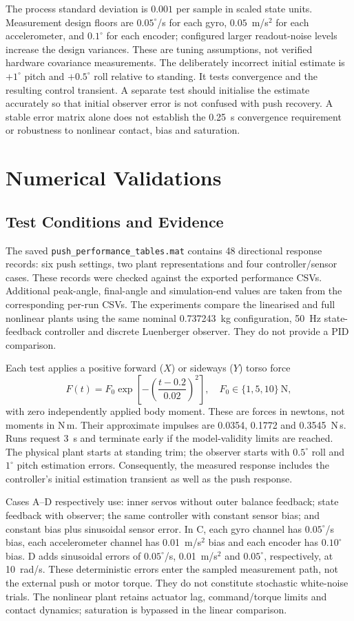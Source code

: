 \documentclass[conference,a4paper]{IEEEtran}
\begin{document}
The process standard deviation is $0.001$ per sample in scaled state units.
Measurement design floors are $0.05^\circ$/s for each gyro,
$0.05$~m/s$^2$ for each accelerometer, and $0.1^\circ$ for each encoder;
configured larger readout-noise levels increase the design variances.
These are tuning assumptions, not verified hardware covariance measurements.
The deliberately incorrect initial estimate is $+1^\circ$ pitch and
$+0.5^\circ$ roll relative to standing. It tests convergence and the resulting
control transient. A separate test should initialise the estimate accurately
so that initial observer error is not confused with push recovery.
A stable error matrix alone does not establish the 0.25~s convergence
requirement or robustness to nonlinear contact, bias and saturation.

\section{Numerical Validations}
\label{sec:numerical_validations}
\subsection{Test Conditions and Evidence}
The saved \texttt{push\_performance\_tables.mat} contains 48 directional response records: six push settings, two plant representations and four controller/sensor cases. These records were checked against the exported performance CSVs. Additional peak-angle, final-angle and simulation-end values are taken from the corresponding per-run CSVs. The experiments compare the linearised and full nonlinear plants using the same nominal 0.737243~kg configuration, 50~Hz state-feedback controller and discrete Luenberger observer. They do not provide a PID comparison.

Each test applies a positive forward ($X$) or sideways ($Y$) torso force
\[
F(t)=F_0\exp\!\left[-\left(\frac{t-0.2}{0.02}\right)^2\right],
\quad F_0\in\{1,5,10\}\ \mathrm{N},
\]
with zero independently applied body moment. These are forces in newtons, not moments in N\,m. Their approximate impulses are 0.0354, 0.1772 and 0.3545~N\,s. Runs request 3~s and terminate early if the model-validity limits are reached. The physical plant starts at standing trim; the observer starts with $0.5^\circ$ roll and $1^\circ$ pitch estimation errors. Consequently, the measured response includes the controller's initial estimation transient as well as the push response.

Cases A--D respectively use: inner servos without outer balance feedback; state feedback with observer; the same controller with constant sensor bias; and constant bias plus sinusoidal sensor error. In C, each gyro channel has $0.05^\circ$/s bias, each accelerometer channel has 0.01~m/s$^2$ bias and each encoder has $0.10^\circ$ bias. D adds sinusoidal errors of $0.05^\circ$/s, 0.01~m/s$^2$ and $0.05^\circ$, respectively, at 10~rad/s. These deterministic errors enter the sampled measurement path, not the external push or motor torque. They do not constitute stochastic white-noise trials. The nonlinear plant retains actuator lag, command/torque limits and contact dynamics; saturation is bypassed in the linear comparison.
\end{document}
